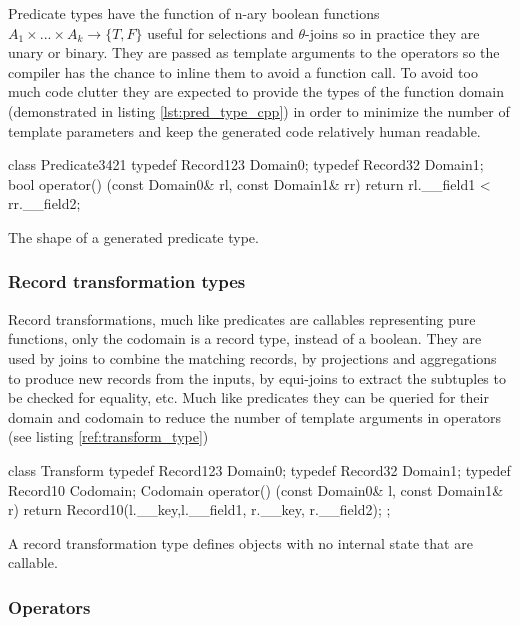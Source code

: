 Predicate types have the function of n-ary boolean functions \(A_1
\times ... \times A_k \to \{T,F\}\) useful for selections and
\(\theta\)-joins so in practice they are unary or binary. They are
passed as template arguments to the operators so the compiler has the
chance to inline them to avoid a function call. To avoid too much code
clutter they are expected to provide the types of the function domain
(demonstrated in listing \ref{lst:pred_type_cpp}) in order to minimize
the number of template parameters and keep the generated code
relatively human readable.

\begin{code}
\begin{cppcode}
class Predicate3421 {
  typedef Record123 Domain0;
  typedef Record32 Domain1;
  bool operator() (const Domain0& rl, const Domain1& rr) {
    return rl.__field1 < rr.__field2;
  }
}
\end{cppcode}
\caption{\label{lst:pred_type_cpp}The shape of a generated predicate type.}
\end{code}

\subsubsection{Record transformation types}

Record transformations, much like predicates are callables
representing pure functions, only the codomain is a record type,
instead of a boolean. They are used by joins to combine the matching
records, by projections and aggregations to produce new records from
the inputs, by equi-joins to extract the subtuples to be checked for
equality, etc. Much like predicates they can be queried for their
domain and codomain to reduce the number of template arguments in
operators (see listing \ref{ref:transform_type})

\begin{code}
\begin{cppcode}
class Transform {
  typedef Record123 Domain0;
  typedef Record32 Domain1;
  typedef Record10 Codomain;
  Codomain operator() (const Domain0& l, const Domain1& r) {
    return Record10(l.__key,l.__field1, r.__key, r.__field2);
  }
};
\end{cppcode}
  \caption{\label{ref:transform_type}A record transformation type
    defines objects with no internal state that are callable.}
\end{code}


\subsubsection{Operators}

